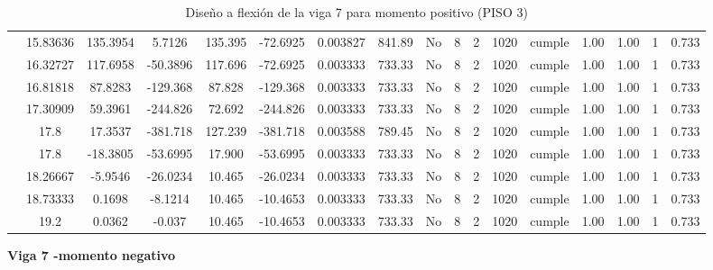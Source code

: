 \begin{table}[H]
{\begin{tabular}{|c|c|c|c|c|c|c|c|c|c|c|c|c|c|c|c|c|}
\cline{2-17}        & 15.83636 & 135.3954 & 5.7126 & 135.395 & -72.6925 & 0.003827 & 841.89 & No  & 8   & 2   & 1020 & \cellcolor[rgb]{ .776,  .937,  .808}cumple & 1.00 & 1.00 & 1   & 0.733 \bigstrut\\
\cline{2-17}        & 16.32727 & 117.6958 & -50.3896 & 117.696 & -72.6925 & 0.003333 & 733.33 & No  & 8   & 2   & 1020 & \cellcolor[rgb]{ .776,  .937,  .808}cumple & 1.00 & 1.00 & 1   & 0.733 \bigstrut\\
\cline{2-17}        & 16.81818 & 87.8283 & -129.368 & 87.828 & -129.368 & 0.003333 & 733.33 & No  & 8   & 2   & 1020 & \cellcolor[rgb]{ .776,  .937,  .808}cumple & 1.00 & 1.00 & 1   & 0.733 \bigstrut\\
\cline{2-17}        & 17.30909 & 59.3961 & -244.826 & 72.692 & -244.826 & 0.003333 & 733.33 & No  & 8   & 2   & 1020 & \cellcolor[rgb]{ .776,  .937,  .808}cumple & 1.00 & 1.00 & 1   & 0.733 \bigstrut\\
\cline{2-17}        & \cellcolor[rgb]{ .851,  .882,  .949}17.8 & 17.3537 & -381.718 & 127.239 & -381.718 & 0.003588 & 789.45 & No  & 8   & 2   & 1020 & \cellcolor[rgb]{ .776,  .937,  .808}cumple & 1.00 & 1.00 & 1   & 0.733 \bigstrut\\
\cline{2-17}        & \cellcolor[rgb]{ .851,  .882,  .949}17.8 & -18.3805 & -53.6995 & 17.900 & -53.6995 & 0.003333 & 733.33 & No  & 8   & 2   & 1020 & \cellcolor[rgb]{ .776,  .937,  .808}cumple & 1.00 & 1.00 & 1   & 0.733 \bigstrut\\
\cline{2-17}        & 18.26667 & -5.9546 & -26.0234 & 10.465 & -26.0234 & 0.003333 & 733.33 & No  & 8   & 2   & 1020 & \cellcolor[rgb]{ .776,  .937,  .808}cumple & 1.00 & 1.00 & 1   & 0.733 \bigstrut\\
\cline{2-17}        & 18.73333 & 0.1698 & -8.1214 & 10.465 & -10.4653 & 0.003333 & 733.33 & No  & 8   & 2   & 1020 & \cellcolor[rgb]{ .776,  .937,  .808}cumple & 1.00 & 1.00 & 1   & 0.733 \bigstrut\\
\cline{2-17}        & 19.2 & 0.0362 & -0.037 & 10.465 & -10.4653 & 0.003333 & 733.33 & No  & 8   & 2   & 1020 & \cellcolor[rgb]{ .776,  .937,  .808}cumple & 1.00 & 1.00 & 1   & 0.733 \bigstrut\\
    \hline
    \end{tabular}%

  

  }%
    \caption{Diseño a flexión de la viga 7 para momento positivo (PISO 3) }
  \label{tab:F VG7 P3 M+}%
\end{table}%
\newpage
\textbf{Viga 7 -momento negativo}
